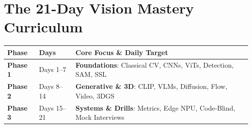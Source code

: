 \section{The 21-Day Vision Mastery Curriculum}\label{sec:plan}

\begin{mem}
\begin{tabularx}{\columnwidth}{@{}l l X@{}}
\toprule
\textbf{Phase} & \textbf{Days} & \textbf{Core Focus \& Daily Target} \\
\midrule
\textbf{Phase 1} & Days 1--7 & \textbf{Foundations}: Classical CV, CNNs, ViTs, Detection, SAM, SSL \\
\textbf{Phase 2} & Days 8--14 & \textbf{Generative \& 3D}: CLIP, VLMs, Diffusion, Flow, Video, 3DGS \\
\textbf{Phase 3} & Days 15--21 & \textbf{Systems \& Drills}: Metrics, Edge NPU, Code-Blind, Mock Interviews \\
\bottomrule
\end{tabularx}
\end{mem}

